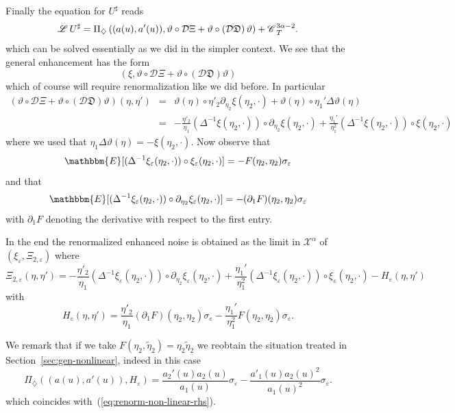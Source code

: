 \documentclass[11pt,reqno]{amsart}
\newcommand{\CC}{\mathscr{C} \hspace{.1em}}
\newcommand{\LL}{\mathscr{L} \hspace{.2em}}
\newcommand{\DF}{\mathfrak{D}}
\begin{document}
Finally the equation for $U^{\sharp}$ reads
\[ \LL U^{\sharp} = \Pi_{\diamondsuit} \left( (a (u), a' (u)), \vartheta \circ
   \mathcal{D} \Xi + \vartheta \circ \left( \mathcal{D} \DF \right) \vartheta
   \right) + \CC_T^{3 \alpha - 2} . \]
which can be solved essentially as we did in the simpler context. We see that
the general enhancement has the form
\[ \left( \xi, \vartheta \circ \mathcal{D} \Xi + \vartheta \circ \left(
   \mathcal{D} \DF \right) \vartheta \right) \]
which of course will require renormalization like we did before. In particular
\begin{eqnarray*}
  \left( \vartheta \circ \mathcal{D} \Xi + \vartheta \circ \left( \mathcal{D}
  \DF \right) \vartheta \right) (\eta, \eta') & = & \vartheta (\eta) \circ
  \eta'_2 \partial_{\eta_2} \xi (\eta_2, \cdot) + \vartheta (\eta) \circ
  \eta_1' \Delta \vartheta (\eta)\\
  & = & - \frac{\eta'_2}{\eta_1} (\Delta^{- 1} \xi (\eta_2, \cdot)) \circ
  \partial_{\eta_2} \xi (\eta_2, \cdot) + \frac{\eta_1'}{\eta_1^2} (\Delta^{-
  1} \xi (\eta_2, \cdot)) \circ \xi (\eta_2, \cdot)
\end{eqnarray*}
where we used that $\eta_1 \Delta \vartheta (\eta) = - \xi (\eta_2, \cdot)$.
Now observe that
\[ \mathbbm{E} [(\Delta^{- 1} \xi_{\varepsilon} (\eta_2, \cdot)) \circ
   \xi_{\varepsilon} (\eta_2, \cdot)] = - F (\eta_2, \eta_2)
   \sigma_{\varepsilon} \]
and that
\[ \mathbbm{E} [(\Delta^{- 1} \xi_{\varepsilon} (\eta_2, \cdot)) \circ
   \partial_{\eta_2} \xi_{\varepsilon} (\eta_2, \cdot)] = - (\partial_1 F)
   (\eta_2, \eta_2) \sigma_{\varepsilon} \]
with $\partial_1 F$ denoting the derivative with respect to the first entry.

In the end the renormalized enhanced noise is obtained as the limit in
$\mathcal{X}^{\alpha}$ of $(\xi_{\varepsilon}, \Xi_{2, \varepsilon})$ where
\[ \Xi_{2, \varepsilon} (\eta, \eta') = - \frac{\eta'_2}{\eta_1} (\Delta^{-
   1} \xi_{\varepsilon} (\eta_2, \cdot)) \circ \partial_{\eta_2}
   \xi_{\varepsilon} (\eta_2, \cdot) + \frac{\eta_1'}{\eta_1^2} (\Delta^{- 1}
   \xi_{\varepsilon} (\eta_2, \cdot)) \circ \xi_{\varepsilon} (\eta_2, \cdot)
   - H_{\varepsilon} (\eta, \eta') \]
with
\[ H_{\varepsilon} (\eta, \eta') = \frac{\eta'_2}{\eta_1} (\partial_1 F)
   (\eta_2, \eta_2) \sigma_{\varepsilon} - \frac{\eta_1'}{\eta_1^2} F (\eta_2,
   \eta_2) \sigma_{\varepsilon} . \]


We remark that if we take $F (\eta_2, \tilde{\eta}_2) = \eta_2 \tilde{\eta}_2$
we reobtain the situation treated in Section~\ref{sec:gen-nonlinear}, indeed
in this case
\[ \Pi_{\diamondsuit} ((a (u), a' (u)), H_{\varepsilon}) = \frac{a_2' (u) a_2
   (u)}{a_1 (u)} \sigma_{\varepsilon} - \frac{a'_1 (u) a_2 (u)^2}{a_1 (u)^2}
   \sigma_{\varepsilon} . \]
which coincides with~(\ref{eq:renorm-non-linear-rhs}).
\end{document}
